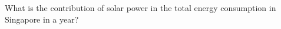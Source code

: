 \documentclass[11pt]{exam}
\begin{document}
\begin{questions}


\question
\label{Q25:Solar power}
What is the contribution of solar power in the total energy consumption in Singapore in a year? \\
%











\end{questions}
\end{document}
